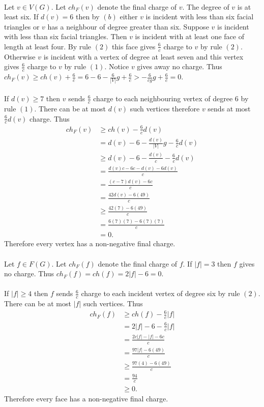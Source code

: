 \documentclass[letterpaper,12pt,oneside,onecolumn]{report}
\begin{document}
\paragraph{}
Let $v \in V(G)$. Let $ch_F(v)$ denote the final charge of $v$. The degree of $v$ is at least six. If $d(v) = 6$ then by $(b)$ either $v$ is incident with less than six facial triangles or $v$ has a neighbour of degree greater than six. Suppose $v$ is incident with less than six facial triangles. Then $v$ is incident with at least one face of length at least four. By rule $(2)$ this face gives $\frac{6}{c}$ charge to $v$ by rule $(2)$. Otherwise $v$ is incident with a vertex of degree at least seven and this vertex gives $\frac{6}{c}$ charge to $v$ by rule $(1)$. Notice $v$ gives away no charge. Thus $ch_F(v) \geq ch(v) + \frac{6}{c} = 6 - 6 - \frac{6}{|V|}g + \frac{6}{c} > -\frac{6}{cg}g + \frac{6}{c} = 0$. 
\paragraph{}
If $d(v) \geq 7$ then $v$ sends $\frac{6}{c}$ charge to each neighbouring vertex of degree $6$ by rule $(1)$. There can be at most $d(v)$ such vertices therefore $v$ sends at most $\frac{6}{c}d(v)$ charge. Thus
\begin{align*}
ch_F(v) &\geq ch(v) -\frac{6}{c}d(v) \\ &= d(v) - 6 - \frac{d(v)}{|V|}g - \frac{6}{c}d(v) \\ &\geq d(v) - 6 -\frac{d(v)}{c} - \frac{6}{c}d(v) \\ &= \frac{d(v)c - 6c - d(v) - 6d(v)}{c} \\ &= \frac{(c - 7)d(v) - 6c}{c} \\ &= \frac{42d(v) - 6(49)}{c} \\ &\geq \frac{42(7) - 6(49)}{c} \\ &= \frac{6(7)(7) - 6(7)(7)}{c} \\ &=  0.
\end{align*}
Therefore every vertex has a non-negative final charge.
\paragraph{}
Let $f \in F(G)$. Let $ch_F(f)$ denote the final charge of $f$. If $|f| = 3$ then $f$ gives no charge. Thus $ch_F(f) = ch(f) = 2|f| - 6 = 0$.
\paragraph{}
If $|f| \geq 4$ then $f$ sends $\frac{6}{c}$ charge to each incident vertex of degree six by rule $(2)$. There can be at most $|f|$ such vertices. Thus
\begin{align*} 
ch_F(f) &\geq ch(f) - \frac{6}{c}|f| \\ &= 2|f| - 6 - \frac{6}{c}|f| \\ &= \frac{2c|f| - |f| - 6c}{c}  \\ &= \frac{97|f| - 6(49)}{c} \\ &\geq \frac{97(4) - 6(49)}{c} \\ &= \frac{94}{c} \\ &\geq 0.
\end{align*}
Therefore every face has a non-negative final charge.
\end{document}
